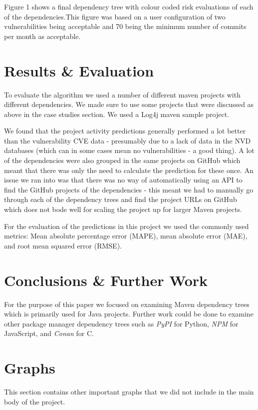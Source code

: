 \documentclass[10pt, onecolumn, compsoc, conference]{IEEEtran}
\begin{document}
Figure 1 shows a final dependency tree with colour coded risk evaluations of each of the dependencies.This figure was based on a user configuration of two vulnerabilities being acceptable and 70 being the minimum number of commits per month as acceptable. 


\section{Results \& Evaluation}
To evaluate the algorithm we used a number of different maven projects with different dependencies. We made sure to use some projects that were discussed as above in the case studies section. We used a Log4j maven sample project. 

We found that the project activity predictions generally performed a lot better than the vulnerability CVE data - presumably due to a lack of data in the NVD databases (which can in some cases mean no vulnerabilities - a good thing). A lot of the dependencies were also grouped in the same projects on GitHub which meant that there was only the need to calculate the prediction for these once. An issue we ran into was that there was no way of automatically using an API to find the GitHub projects of the dependencies - this meant we had to manually go through each of the dependency trees and find the project URLs on GitHub which does not bode well for scaling the project up for larger Maven projects. 

For the evaluation of the predictions in this project we used the commonly used metrics: Mean absolute percentage error (MAPE), mean absolute error (MAE), and root mean squared error (RMSE). 

\section{Conclusions \& Further Work}
For the purpose of this paper we focused on examining Maven dependency trees which is primarily used for Java projects. Further work could be done to examine other package manager dependency trees such as \textit{PyPI} for Python, \textit{NPM} for JavaScript, and \textit{Conan} for C. 


\appendices
\section{Graphs}
This section contains other important graphs that we did not include in the main body of the project.

\ifCLASSOPTIONcaptionsoff
  \newpage
\fi
\end{document}
